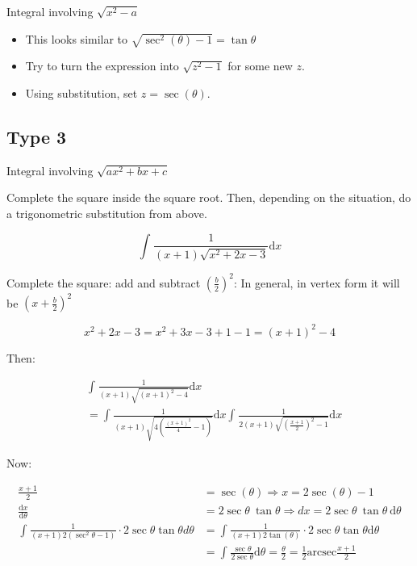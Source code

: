 \documentclass[12pt]{article}
\theoremstyle{plain}
\theoremstyle{remark}
\theoremstyle{definition}
\begin{document}
Integral involving \(\sqrt{x^{2} - a}\)

\begin{itemize}
\item
  This looks similar to \(\sqrt{\sec^{2}(\theta) - 1} = \tan\theta\)
\item
  Try to turn the expression into \(\sqrt{z^{2} - 1}\) for some new
  \(z\).
\item
  Using substitution, set \(z = \sec(\theta)\).
\end{itemize}


\subsection{Type 3}

Integral involving \(\sqrt{ax^{2} + bx + c}\)

Complete the square inside the square root. Then, depending on the
situation, do a trigonometric substitution from above.

\[\int_{}^{}{\frac{1}{(x + 1)\sqrt{x^{2} + 2x - 3}}\text{d}x}\]

Complete the square: add and subtract
\(\left( \frac{b}{2} \right)^{2}\): In general, in vertex form it will
be \(\left( x + \frac{b}{2} \right)^{2}\)

\[x^{2} + 2x - 3 = x^{2} + 3x - 3 + 1 - 1 = (x + 1)^{2} - 4\]

Then:

\begin{align*}
&\int_{}^{}{\frac{1}{(x + 1)\sqrt{(x + 1)^{2} - 4}}\text{d}x} \\
&= \int_{}^{}{\frac{1}{(x + 1)\sqrt{4\left( \frac{(x + 1)^{2}}{4} - 1 \right)}}\text{d}x}\int_{}^{}{\frac{1}{2(x + 1)\sqrt{\left( \frac{x + 1}{2} \right)^{2} - 1}}\text{d}x}
\end{align*}


Now:

\begin{align*}
\frac{x + 1}{2} &= \sec(\theta) \Rightarrow x = 2\sec(\theta) - 1 \\
\frac{\text{d}x}{\text{d}\theta} &= 2\sec\theta \ \tan\theta \Rightarrow dx = 2\sec\theta \ \tan\theta \ \text{d}\theta \\
\int_{}^{}\frac{1}{(x + 1)2\left( \sec^{2}\theta - 1 \right)} \cdot 2\sec\theta\tan\theta d\theta &= \int_{}^{}\frac{1}{(x + 1)2\tan(\theta)} \cdot 2\sec\theta\tan\theta\text{d}\theta \\
&= \int_{}^{}{\frac{\sec\theta}{2\sec\theta}\text{d}\theta} = \frac{\theta}{2} = \frac{1}{2}\text{arcsec}\frac{x + 1}{2}
\end{align*}
\end{document}
